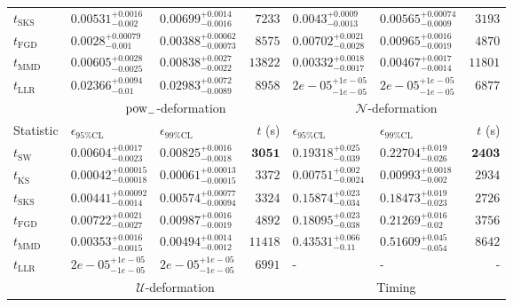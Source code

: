 \begin{tabular}{l|llr|llr}
	$t_{\mathrm{SKS}}$ & $0.00531_{-0.002}^{+0.0016}$ & $0.00699_{-0.0016}^{+0.0014}$ & $7233$ & $0.0043_{-0.0013}^{+0.0009}$ & $0.00565_{-0.0009}^{+0.00074}$ & $3193$ \\
	$t_{\mathrm{FGD}}$ & ${\mathbf{0.0028_{-0.001}^{+0.00079}}}$ & ${\mathbf{0.00388_{-0.00073}^{+0.00062}}}$ & $8575$ & $0.00702_{-0.0028}^{+0.0021}$ & $0.00965_{-0.0019}^{+0.0016}$ & $4870$ \\
	$t_{\mathrm{MMD}}$ & $0.00605_{-0.0025}^{+0.0028}$ & $0.00838_{-0.0022}^{+0.0027}$ & $13822$ & $0.00332_{-0.0017}^{+0.0018}$ & $0.00467_{-0.0014}^{+0.0017}$ & $11801$ \\
	$t_{\mathrm{LLR}}$ & $0.02366_{-0.01}^{+0.0094}$ & $0.02983_{-0.0089}^{+0.0072}$ & $8958$ & $2e-05_{-1e-05}^{+1e-05}$ & $2e-05_{-1e-05}^{+1e-05}$ & $6877$ \\
	\toprule
	\multicolumn{1}{c}{} & \multicolumn{3}{c}{$\rm{pow}_{-}$-deformation} & \multicolumn{3}{c}{$\mathcal{N}$-deformation} \\
	Statistic & $\epsilon_{95\%\mathrm{CL}}$ & $\epsilon_{99\%\mathrm{CL}}$ & $t$ (s) & $\epsilon_{95\%\mathrm{CL}}$ & $\epsilon_{99\%\mathrm{CL}}$ & $t$ (s) \\
	\midrule
	$t_{\mathrm{SW}}$ & $0.00604_{-0.0023}^{+0.0017}$ & $0.00825_{-0.0018}^{+0.0016}$ & ${\mathbf{3051}}$ & $0.19318_{-0.039}^{+0.025}$ & $0.22704_{-0.026}^{+0.019}$ & ${\mathbf{2403}}$ \\
	$t_{\overline{\mathrm{KS}}}$ & ${\mathbf{0.00042_{-0.00018}^{+0.00015}}}$ & ${\mathbf{0.00061_{-0.00015}^{+0.00013}}}$ & $3372$ & ${\mathbf{0.00751_{-0.0024}^{+0.002}}}$ & ${\mathbf{0.00993_{-0.002}^{+0.0018}}}$ & $2934$ \\
	$t_{\mathrm{SKS}}$ & $0.00441_{-0.0014}^{+0.00092}$ & $0.00574_{-0.00094}^{+0.00077}$ & $3324$ & $0.15874_{-0.034}^{+0.023}$ & $0.18473_{-0.023}^{+0.019}$ & $2726$ \\
	$t_{\mathrm{FGD}}$ & $0.00722_{-0.0027}^{+0.0021}$ & $0.00987_{-0.0019}^{+0.0016}$ & $4892$ & $0.18095_{-0.038}^{+0.023}$ & $0.21269_{-0.02}^{+0.016}$ & $3756$ \\
	$t_{\mathrm{MMD}}$ & $0.00353_{-0.0015}^{+0.0016}$ & $0.00494_{-0.0012}^{+0.0014}$ & $11418$ & $0.43531_{-0.11}^{+0.066}$ & $0.51609_{-0.054}^{+0.045}$ & $8642$ \\
	$t_{\mathrm{LLR}}$ & $2e-05_{-1e-05}^{+1e-05}$ & $2e-05_{-1e-05}^{+1e-05}$ & $6991$ & - & - & - \\
	\toprule
	\multicolumn{1}{c}{} & \multicolumn{3}{c}{$\mathcal{U}$-deformation} & \multicolumn{3}{c}{Timing} \\

\end{tabular}
